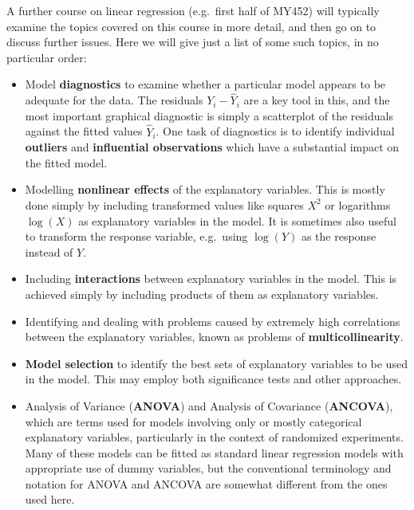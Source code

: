 A further course on linear regression (e.g.\ first half of MY452) will
typically examine the topics covered on this course in more detail,
and then go on to discuss further issues. Here we will give just a list
of some such topics, in no particular order:
\begin{itemize}
\item
Model \textbf{diagnostics} to examine whether a particular model appears
to be adequate for the data. The residuals $Y_{i}-\hat{Y}_{i}$ are a key
tool in this, and the most important graphical diagnostic is simply a
scatterplot of the residuals against the fitted values $\hat{Y}_{i}$.
One task of diagnostics is to identify individual \textbf{outliers} and
\textbf{influential observations} which have a substantial
impact on the fitted model.
\item
Modelling \textbf{nonlinear effects} of the explanatory variables. This
is mostly done simply by including transformed values
like squares $X^{2}$ or logarithms
$\log(X)$ as explanatory variables in the model.
It is sometimes also useful to transform the response variable, e.g.\
using $\log(Y)$ as the response instead of $Y$.
\item
Including \textbf{interactions} between explanatory variables in the
model. This is achieved simply by including products of them
as explanatory variables.
\item
Identifying and dealing with problems caused by extremely high
correlations between the explanatory variables, known as problems of
\textbf{multicollinearity}.
\item
\textbf{Model selection} to identify the best sets of explanatory
variables to be used in the model. This may employ both significance tests
and other approaches.
\item
Analysis of Variance (\textbf{ANOVA}) and Analysis
of Covariance (\textbf{ANCOVA}), which are terms used for models
involving only or mostly categorical explanatory variables, particularly
in the context of randomized experiments. Many of these models can be
fitted as standard linear regression models with appropriate use of
dummy variables, but the conventional terminology and notation for ANOVA
and ANCOVA are somewhat different from the ones used here.
\end{itemize}

